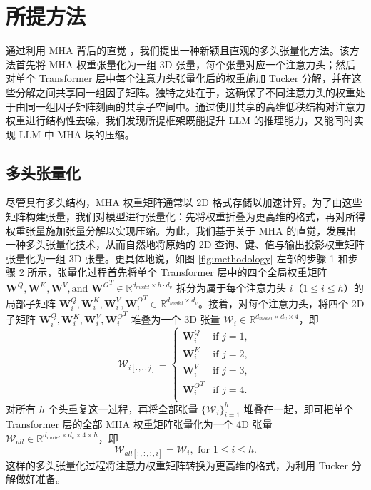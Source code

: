 
\section{所提方法}\label{methodology}
通过利用 MHA 背后的直觉 \cite{clark2019does, vig2019multiscale,vig2019analyzing}，我们提出一种新颖且直观的多头张量化方法。该方法首先将 MHA 权重张量化为一组 3D 张量，每个张量对应一个注意力头；然后对单个 Transformer 层中每个注意力头张量化后的权重施加 Tucker 分解，并在这些分解之间共享同一组因子矩阵。独特之处在于，这确保了不同注意力头的权重处于由同一组因子矩阵刻画的共享子空间中。通过使用共享的高维低秩结构对注意力权重进行结构性去噪，我们发现所提框架既能提升 LLM 的推理能力，又能同时实现 LLM 中 MHA 块的压缩。

\subsection{多头张量化}\label{tensorisation}
尽管具有多头结构，MHA 权重矩阵通常以 2D 格式存储以加速计算。为了由这些矩阵构建张量，我们对模型进行张量化：先将权重折叠为更高维的格式，再对所得权重张量施加张量分解以实现压缩。为此，我们基于关于 MHA 的直觉，发展出一种多头张量化技术，从而自然地将原始的 2D 查询、键、值与输出投影权重矩阵张量化为一组 3D 张量。更具体地说，如图 \ref{fig:methodology} 左部的步骤 1 和步骤 2 所示，张量化过程首先将单个 Transformer 层中的四个全局权重矩阵 $\mathbf{W}^Q, \mathbf{W}^K, \mathbf{W}^V, \text{and } {\mathbf{W}^O}^T \in \mathbb{R}^{d_{model} \times h \cdot d_v}$ 拆分为属于每个注意力头 $i$（$1\leq i \leq h$）的局部子矩阵 $\mathbf{W}^Q_i, \mathbf{W}^K_i, \mathbf{W}^V_i, {\mathbf{W}^O_i}^T \in \mathbb{R}^{d_{model} \times  d_v}$。接着，对每个注意力头，将四个 2D 子矩阵 $\mathbf{W}^Q_i, \mathbf{W}^K_i, \mathbf{W}^V_i, {\mathbf{W}^O_i}^T$ 堆叠为一个 3D 张量 $\mathcal{W}_i \in \mathbb{R}^{d_{model} \times d_v \times 4}$，即
\begin{equation}
    \mathcal{W}_{i [:,:,j]} = 
    \begin{cases} 
        \mathbf{W}^Q_i & \text{if } j = 1, \\
        \mathbf{W}^K_i & \text{if } j = 2, \\
        \mathbf{W}^V_i & \text{if } j = 3, \\
        {\mathbf{W}^O_i}^T & \text{if } j = 4. \\
    \end{cases}
    \label{eq:single_head_weight}
\end{equation}
对所有 $h$ 个头重复这一过程，再将全部张量 $\{\mathcal{W}_i \}_{i=1}^h$ 堆叠在一起，即可把单个 Transformer 层的全部 MHA 权重矩阵张量化为一个 4D 张量 $\mathcal{W}_{all} \in \mathbb{R}^{d_{model} \times d_v \times 4 \times h}$，即
\begin{equation}
    \mathcal{W}_{all[:,:,:,i]} = \mathcal{W}_i ,\text{ for  } 1\leq i \leq h.
    \label{eq:allweights}
\end{equation}
这样的多头张量化过程将注意力权重矩阵转换为更高维的格式，为利用 Tucker 分解做好准备。


